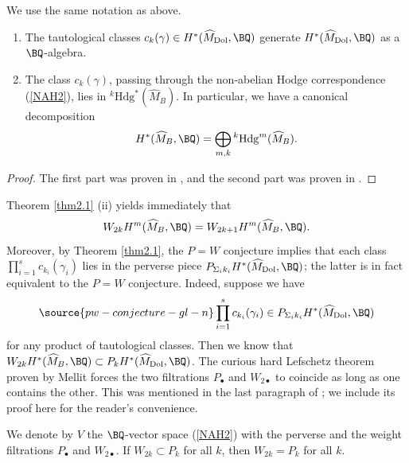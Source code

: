 \begin{thm}
\notready\label{thm2.1}
We use the same notation as above.
\begin{enumerate}
    \item[(i)] The tautological classes $c_k(\gamma)\in H^*(\widehat{M}_{\mathrm{Dol}}, \BQ)$ generate $H^*(\widehat{M}_\mathrm{Dol}, \BQ)$ as a $\BQ$-algebra.
    \item[(ii)] The class $c_k(\gamma)$, passing through the non-abelian Hodge correspondence (\ref{NAH2}), lies in $^k\mathrm{Hdg}^*(\widehat{M}_B)$. In particular, we have a canonical decomposition
    \[
H^*(\widehat{M}_B, \BQ) = \bigoplus_{m,k} {^k\mathrm{Hdg}^m(\widehat{M}_B)}.    \]
\end{enumerate}
\end{thm}

\begin{proof}
The first part was proven in \cite{Markman}, and the second part was proven in \cite{Shende}.
\end{proof}


Theorem \ref{thm2.1} (ii) yields immediately that
\[
W_{2k}H^m(\widehat{M}_B, \BQ) = W_{2k+1}H^m(\widehat{M}_B, \BQ).
\]
Moreover, by Theorem \ref{thm2.1}, the $P=W$ conjecture implies that each class $\prod_{i=1}^s c_{k_i}(\gamma_i)$ lies in the perverse piece $P_{\Sigma_i{k_i}}H^*(\widehat{M}_{\mathrm{Dol}}, \BQ)$; the latter is in fact equivalent to the $P=W$ conjecture. Indeed, suppose we have
\begin{equation}\label{taut}
\source{pw-conjecture-gl-n}
\prod_{i=1}^s c_{k_i}(\gamma_i) \in P_{\Sigma_i{k_i}}H^*(\widehat{M}_{\mathrm{Dol}}, \BQ)
\end{equation}
for any product of tautological classes.
Then we know that $W_{2k}H^*(\widehat{M}_B, \BQ) \subset P_kH^*(\widehat{M}_{\mathrm{Dol}}, \BQ)$. The curious hard Lefschetz theorem proven by Mellit \cite{Mellit} forces the two filtrations $P_\bullet$ and $W_{2\bullet}$ to coincide as long as one contains the other. This was mentioned in the last paragraph of \cite[Section 1]{Mellit}; we include its proof here for the reader's convenience.

\begin{lem}
\notready
We denote by $V$ the $\BQ$-vector space (\ref{NAH2}) with the perverse and the weight filtrations $P_\bullet$ and $W_{2\bullet}$. If $W_{2k} \subset P_k$ for all $k$, then $W_{2k} = P_k$ for all $k$.
\end{lem}

